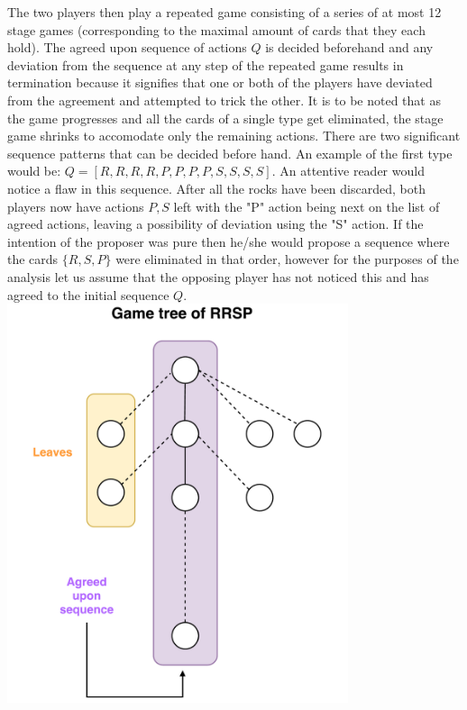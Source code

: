 \documentclass[11pt]{article}
\begin{document}
The two players then play a repeated game consisting of a series of at most 12 stage games (corresponding to the maximal amount of cards that they each hold). The agreed upon sequence of actions $Q$ is decided beforehand
and any deviation from the sequence at any step of the repeated game results in termination because it signifies that one or both of the players have deviated from the agreement and attempted to trick the other. It is to be noted that as the game progresses and all the cards of a single type get eliminated, the stage game shrinks to accomodate only the remaining actions. 
There are two significant sequence patterns that can be decided before hand. An example of the first type would be:
$Q = [R,R,R,R,P,P,P,P,S,S,S,S]$. An attentive reader would notice a flaw in this sequence. After all the rocks have been discarded,
both players now have actions ${P,S}$ left with the "P" action being next on the list of agreed actions, leaving a possibility of 
deviation using the "S" action. If the intention of the proposer was pure then he/she would propose a sequence where the cards
$\{R,S,P\}$ were eliminated in that order, however for the purposes of the analysis let us assume that the opposing player has not noticed this and has agreed to the initial sequence $Q$. \\

\includegraphics[width=10cm]{treediag}
\end{document}
